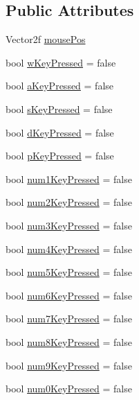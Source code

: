 \subsection*{Public Attributes}
\begin{DoxyCompactItemize}
\item 
Vector2f \hyperlink{struct_controls_input_a9d2305fbda223544a306e37f2c9c89ec}{mouse\+Pos}
\item 
bool \hyperlink{struct_controls_input_adaef41f564822ecd14cc59ac5549f517}{w\+Key\+Pressed} = false
\item 
bool \hyperlink{struct_controls_input_a3d2a78cb660f43a9aec0cc2eff4102dd}{a\+Key\+Pressed} = false
\item 
bool \hyperlink{struct_controls_input_aa06968f2e5219f1e73be1c996268b5f9}{s\+Key\+Pressed} = false
\item 
bool \hyperlink{struct_controls_input_a6ce83f226b91636c1fd39990b58f392a}{d\+Key\+Pressed} = false
\item 
bool \hyperlink{struct_controls_input_a2e027179dcc06bdb10c74ccd4e7983e6}{p\+Key\+Pressed} = false
\item 
bool \hyperlink{struct_controls_input_a5005e6355bd91cbf3e32f75ee1324e7e}{num1\+Key\+Pressed} = false
\item 
bool \hyperlink{struct_controls_input_a3eb8030199fbda9eb2071e7e89c9cb07}{num2\+Key\+Pressed} = false
\item 
bool \hyperlink{struct_controls_input_a2b422f2d084970ac09c6a9b68aa03e22}{num3\+Key\+Pressed} = false
\item 
bool \hyperlink{struct_controls_input_aec8b1eccecbae03406e12a87b12520d9}{num4\+Key\+Pressed} = false
\item 
bool \hyperlink{struct_controls_input_aaf569ad5596dbb778880703879bbc765}{num5\+Key\+Pressed} = false
\item 
bool \hyperlink{struct_controls_input_a7835e1c719b55dc240e322486a4851c7}{num6\+Key\+Pressed} = false
\item 
bool \hyperlink{struct_controls_input_af7bf803f6c7b2e02ae83c85b42a965df}{num7\+Key\+Pressed} = false
\item 
bool \hyperlink{struct_controls_input_ab25d59fc0450d8880ada1bcbbccdd4a8}{num8\+Key\+Pressed} = false
\item 
bool \hyperlink{struct_controls_input_af0062f4839b149fe0c7402b74d883c7b}{num9\+Key\+Pressed} = false
\item 
bool \hyperlink{struct_controls_input_a22302eb427b7efc7cb629484e75aa0f9}{num0\+Key\+Pressed} = false

\end{DoxyCompactItemize}
